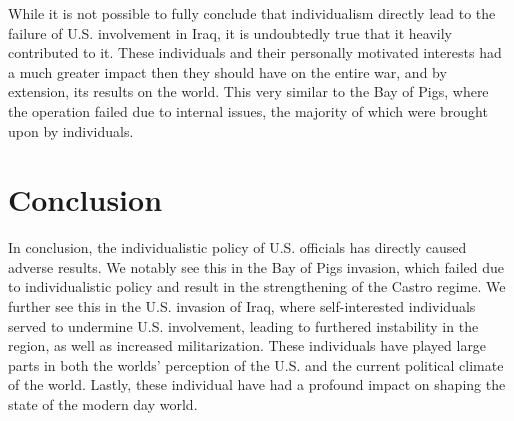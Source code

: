 \documentclass[12pt, twoside]{article}
\begin{document}
        While it is not possible to fully conclude that individualism directly lead to the failure of U.S. involvement in Iraq, it is undoubtedly true that it heavily contributed to it. These individuals and their personally motivated interests had a much greater impact then they should have on the entire war, and by extension, its results on the world. This very similar to the Bay of Pigs, where the operation failed due to internal issues, the majority of which were brought upon by individuals.  

\section{Conclusion}
        In conclusion, the individualistic policy of U.S. officials has directly caused adverse results. We notably see this in the Bay of Pigs invasion, which failed due to individualistic policy and result in the strengthening of the Castro regime. We further see this in the U.S. invasion of Iraq, where self-interested individuals served to undermine U.S. involvement, leading to furthered instability in the region, as well as increased militarization. These individuals have played large parts in both the worlds' perception of the U.S. and the current political climate of the world. Lastly, these individual have had a profound impact on shaping the state of the modern day world.

\printbibliography[heading=bibintoc]
\end{document}
